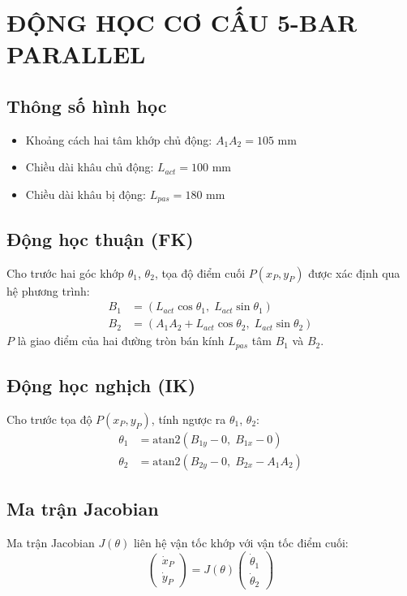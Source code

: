 \chapter{ĐỘNG HỌC CƠ CẤU 5-BAR PARALLEL}
\label{app:fivebar}

\section*{Thông số hình học}
\begin{itemize}
    \item Khoảng cách hai tâm khớp chủ động: $A_1A_2 = 105$ mm
    \item Chiều dài khâu chủ động: $L_{act} = 100$ mm
    \item Chiều dài khâu bị động: $L_{pas} = 180$ mm
\end{itemize}

\section*{Động học thuận (FK)}
Cho trước hai góc khớp $\theta_1$, $\theta_2$, tọa độ điểm cuối $P(x_P, y_P)$
được xác định qua hệ phương trình:
\begin{align}
    B_1 &= (L_{act}\cos\theta_1,\; L_{act}\sin\theta_1) \\
    B_2 &= (A_1A_2 + L_{act}\cos\theta_2,\; L_{act}\sin\theta_2)
\end{align}
$P$ là giao điểm của hai đường tròn bán kính $L_{pas}$ tâm $B_1$ và $B_2$.

\section*{Động học nghịch (IK)}
Cho trước tọa độ $P(x_P, y_P)$, tính ngược ra $\theta_1$, $\theta_2$:
\begin{align}
    \theta_1 &= \text{atan2}(B_{1y} - 0,\; B_{1x} - 0) \\
    \theta_2 &= \text{atan2}(B_{2y} - 0,\; B_{2x} - A_1A_2)
\end{align}

\section*{Ma trận Jacobian}
Ma trận Jacobian $J(\theta)$ liên hệ vận tốc khớp với vận tốc điểm cuối:
\begin{equation}
    \begin{pmatrix} \dot{x}_P \\ \dot{y}_P \end{pmatrix}
    = J(\theta)
    \begin{pmatrix} \dot{\theta}_1 \\ \dot{\theta}_2 \end{pmatrix}
\end{equation}
